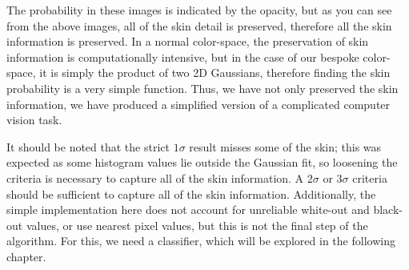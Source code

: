 The probability in these images is indicated by the opacity, but as you can see from the above images, all of the skin detail is preserved, therefore all the skin information is preserved. In a normal color-space, the preservation of skin information is computationally intensive, but in the case of our bespoke color-space, it is simply the product of two 2D Gaussians, therefore finding the skin probability is a very simple function. Thus, we have not only preserved the skin information, we have produced a simplified version of a complicated computer vision task. 

It should be noted that the strict $1\sigma$ result misses some of the skin; this was expected as some histogram values lie outside the Gaussian fit, so loosening the criteria is necessary to capture all of the skin information. A $2\sigma$ or $3\sigma$ criteria should be sufficient to capture all of the skin information. Additionally, the simple implementation here does not account for unreliable white-out and black-out values, or use nearest pixel values, but this is not the final step of the algorithm. For this, we need a classifier, which will be explored in the following chapter.
